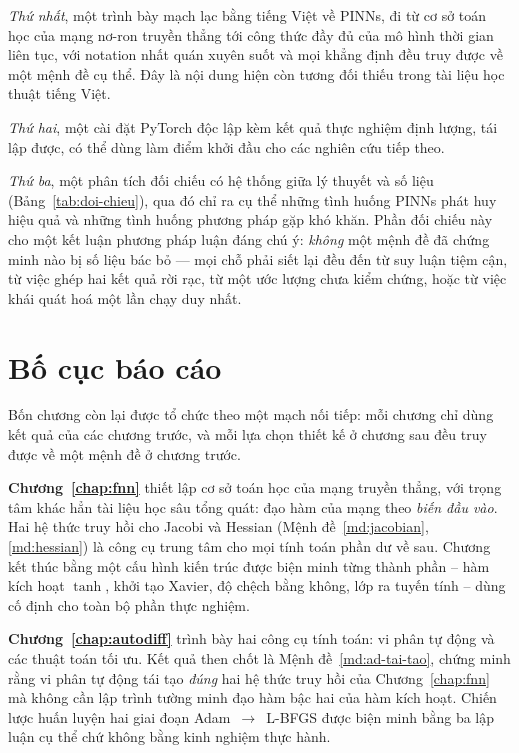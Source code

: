 \emph{Thứ nhất}, một trình bày mạch lạc bằng tiếng Việt về PINNs, đi từ cơ sở toán
học của mạng nơ-ron truyền thẳng tới công thức đầy đủ của mô hình thời gian liên
tục, với notation nhất quán xuyên suốt và mọi khẳng định đều truy được về một mệnh
đề cụ thể. Đây là nội dung hiện còn tương đối thiếu trong tài liệu học thuật tiếng
Việt.
 
\emph{Thứ hai}, một cài đặt PyTorch độc lập kèm kết quả thực nghiệm định lượng,
tái lập được, có thể dùng làm điểm khởi đầu cho các nghiên cứu tiếp theo.
 
\emph{Thứ ba}, một phân tích đối chiếu có hệ thống giữa lý thuyết và số liệu
(Bảng~\ref{tab:doi-chieu}), qua đó chỉ ra cụ thể những tình huống PINNs phát huy
hiệu quả và những tình huống phương pháp gặp khó khăn. Phần đối chiếu này cho một
kết luận phương pháp luận đáng chú ý: \emph{không} một mệnh đề đã chứng minh nào
bị số liệu bác bỏ --- mọi chỗ phải siết lại đều đến từ suy luận tiệm cận, từ
việc ghép hai kết quả rời rạc, từ một ước lượng chưa kiểm chứng, hoặc từ việc
khái quát hoá một lần chạy duy nhất.
 
\section{Bố cục báo cáo}
\label{sec:bo-cuc}
 
Bốn chương còn lại được tổ chức theo một mạch nối tiếp: mỗi chương chỉ dùng kết
quả của các chương trước, và mỗi lựa chọn thiết kế ở chương sau đều truy được về
một mệnh đề ở chương trước.
 
\textbf{Chương~\ref{chap:fnn}} thiết lập cơ sở toán học của mạng truyền thẳng, với
trọng tâm khác hẳn tài liệu học sâu tổng quát: đạo hàm của mạng theo \emph{biến
đầu vào}. Hai hệ thức truy hồi cho Jacobi và Hessian
(Mệnh đề~\ref{md:jacobian}, \ref{md:hessian}) là công cụ trung tâm cho mọi tính
toán phần dư về sau. Chương kết thúc bằng một cấu hình kiến trúc được biện minh
từng thành phần -- hàm kích hoạt $\tanh$, khởi tạo Xavier, độ chệch bằng không,
lớp ra tuyến tính -- dùng cố định cho toàn bộ phần thực nghiệm.
 
\textbf{Chương~\ref{chap:autodiff}} trình bày hai công cụ tính toán: vi phân tự
động và các thuật toán tối ưu. Kết quả then chốt là
Mệnh đề~\ref{md:ad-tai-tao}, chứng minh rằng vi phân tự động tái tạo \emph{đúng}
hai hệ thức truy hồi của Chương~\ref{chap:fnn} mà không cần lập trình tường minh
đạo hàm bậc hai của hàm kích hoạt. Chiến lược huấn luyện hai giai đoạn
Adam~$\to$~L-BFGS được biện minh bằng ba lập luận cụ thể chứ không bằng kinh
nghiệm thực hành.
 
